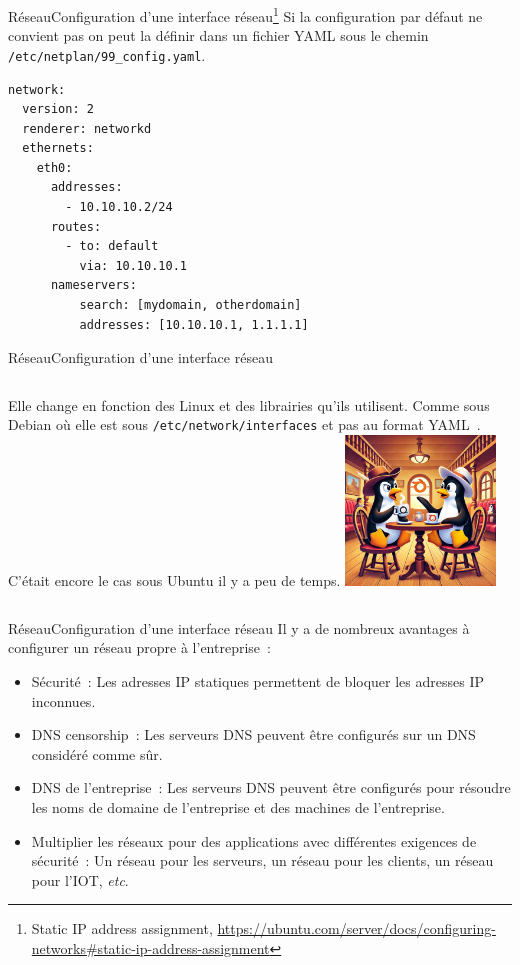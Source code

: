\documentclass{beamer}
\begin{document}
    \begin{frame}[fragile]{Réseau}{Configuration d'une interface réseau\footnote{Static IP address assignment, \url{https://ubuntu.com/server/docs/configuring-networks\#static-ip-address-assignment}}}
        Si la configuration par défaut ne convient pas on peut la définir dans un fichier YAML sous le chemin \lstinline{/etc/netplan/99_config.yaml}.
        \begin{lstlisting}
network:
  version: 2
  renderer: networkd
  ethernets:
    eth0:
      addresses:
        - 10.10.10.2/24
      routes:
        - to: default
          via: 10.10.10.1
      nameservers:
          search: [mydomain, otherdomain]
          addresses: [10.10.10.1, 1.1.1.1]
        \end{lstlisting}
    \end{frame}

    \begin{frame}{Réseau}{Configuration d'une interface réseau}
        \begin{columns}
            Elle change en fonction des Linux et des librairies qu'ils utilisent.
            \bigbreak
            Comme sous Debian où elle est sous \lstinline{/etc/network/interfaces} et pas au format YAML~.
            C'était encore le cas sous Ubuntu il y a peu de temps.
            \includegraphics[width=4cm]{image/pinguin-arguing}
        \end{columns}
    \end{frame}

    \begin{frame}{Réseau}{Configuration d'une interface réseau}
        Il y a de nombreux avantages à configurer un réseau propre à l'entreprise~:
        \begin{itemize}
            \item Sécurité~: Les adresses IP statiques permettent de bloquer les adresses IP inconnues.
            \item DNS censorship~: Les serveurs DNS peuvent être configurés sur un DNS considéré comme sûr.
            \item DNS de l'entreprise~: Les serveurs DNS peuvent être configurés pour résoudre les noms de domaine de l'entreprise et des machines de l'entreprise.
            \item Multiplier les réseaux pour des applications avec différentes exigences de sécurité~: Un réseau pour les serveurs, un réseau pour les clients, un réseau pour l'IOT, \textit{etc}.
        \end{itemize}
    \end{frame}
\end{document}
